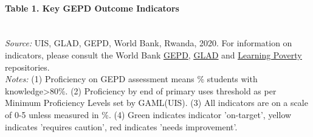 \documentclass[twocolumn]{article}
\let\oldparagraph\paragraph
\renewcommand{\paragraph}[1]{\oldparagraph{#1}\mbox{}}
\begin{document}
\vfill

\setlength\dashlinedash{0.2pt}
\setlength\dashlinegap{1.5pt}
\setlength\arrayrulewidth{0.3pt}

\hypertarget{table-1.-key-gepd-outcome-indicators}{%
\paragraph{Table 1. Key GEPD Outcome
Indicators}\label{table-1.-key-gepd-outcome-indicators}}

\begin{table}[H]
\\
\color{darkgray}\scriptsize{\textit{Source:} UIS, GLAD, GEPD, World Bank, Rwanda, 2020. For information on indicators, please consult the World Bank \href{https://github.com/worldbank/GEPD}{\underline{GEPD}}, \href{https://github.com/worldbank/GLAD}{\underline{GLAD}} and \href{https://github.com/worldbank/LearningPoverty}{\underline{Learning Poverty}} repositories.}\\
\color{darkgray}\scriptsize{\textit{Notes:} (1) Proficiency on GEPD assessment means \% students with knowledge\textgreater{80\%}. (2) Proficiency by end of primary uses threshold as per Minimum Proficiency Levels set by GAML(UIS). (3) All indicators are on a scale of 0-5 unless measured in \%. (4) Green indicates indicator 'on-target', yellow indicates 'requires caution', red indicates 'needs improvement'.}
\end{table}
\raggedbottom
\end{document}
